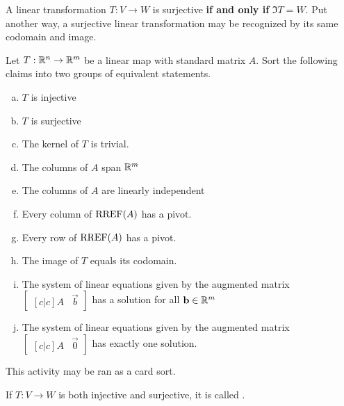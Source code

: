 \begin{applicationActivities}
\begin{fact}
A linear transformation $T:V \rightarrow W$ is surjective \textbf{if and only if} $\Im T = W$. Put another way, a surjective linear transformation may be
recognized by its same codomain and image.
\end{fact}

\begin{activity}{15}
Let $T: \mathbb{R}^n \rightarrow \mathbb{R}^m$ be a linear map with standard matrix $A$.
Sort the following claims into two groups of equivalent statements.
\begin{multicols}{2}
\begin{enumerate}[(a)]
\item $T$ is injective
\item $T$ is surjective
\item The kernel of \(T\) is trivial.
\item The columns of $A$ span $\mathbb{R}^m$
\item The columns of $A$ are linearly independent
\item Every column of $\operatorname{RREF}(A)$ has a pivot.
\item Every row of $\operatorname{RREF}(A)$ has a pivot.
\item The image of \(T\) equals its codomain.
\item The system of linear equations given by the augmented matrix $\begin{bmatrix}[c|c]A & \vec{b} \end{bmatrix}$ has a solution for all $\mathbf{b} \in \mathbb{R}^m$
\item The system of linear equations given by the augmented matrix $\begin{bmatrix}[c|c] A & \vec{0} \end{bmatrix}$ has exactly one solution.
\end{enumerate}
\end{multicols}
\begin{TBLnote}
  This activity may be ran as a card sort.
\end{TBLnote}


\end{activity}

\begin{definition}
If $T: V \rightarrow W$ is both injective and surjective, it is called .
\end{definition}


\end{applicationActivities}
